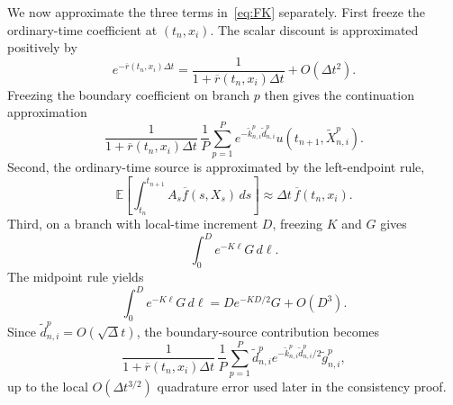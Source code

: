 \documentclass[11pt]{article}
\theoremstyle{definition}
\theoremstyle{remark}
\newcommand{\E}{\mathbb{E}}
\newcommand{\dt}{\Delta t}
\begin{document}
	We now approximate the three terms in~\eqref{eq:FK} separately.  First freeze the ordinary-time coefficient at $(t_n,x_i)$.  The scalar discount is approximated positively by
	\begin{equation}
		e^{-\overline r(t_n,x_i)\dt}
		=\frac{1}{1+\overline r(t_n,x_i)\dt}+O(\dt^2).
		\label{eq:ordinary-discount}
	\end{equation}
	Freezing the boundary coefficient on branch $p$ then gives the continuation approximation
	\begin{equation}
		\frac{1}{1+\overline r(t_n,x_i)\dt}\,
		\frac1P\sum_{p=1}^P
		e^{-\widetilde k_{n,i}^p\widetilde d_{n,i}^p}
		u(t_{n+1},\widetilde X_{n,i}^p).
		\label{eq:linear-continuation}
	\end{equation}
	Second, the ordinary-time source is approximated by the left-endpoint rule,
	\begin{equation}
		\E\!\left[\int_{t_n}^{t_{n+1}}A_s\overline f(s,X_s)\,ds\right]
		\approx\dt\,\overline f(t_n,x_i).
		\label{eq:linear-volume-source}
	\end{equation}
	Third, on a branch with local-time increment $D$, freezing $K$ and $G$ gives
	\[
	\int_0^D e^{-K\ell}G\,d\ell.
	\]
	The midpoint rule yields
	\begin{equation}
		\int_0^D e^{-K\ell}G\,d\ell
		=D e^{-KD/2}G+O(D^3).
		\label{eq:midpoint-local-time}
	\end{equation}
	Since $\widetilde d_{n,i}^p=O(\sqrt\dt)$, the boundary-source contribution becomes
	\begin{equation}
		\frac{1}{1+\overline r(t_n,x_i)\dt}\,
		\frac1P\sum_{p=1}^P
		\widetilde d_{n,i}^p e^{-\widetilde k_{n,i}^p\widetilde d_{n,i}^p/2}
		\widetilde g_{n,i}^p,
		\label{eq:linear-boundary-source}
	\end{equation}
	up to the local $O(\dt^{3/2})$ quadrature error used later in the consistency proof.
	
\end{document}
